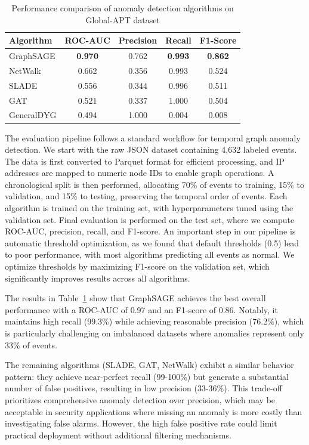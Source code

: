 \begin{table}[htbp]
\centering
\caption{Performance comparison of anomaly detection algorithms on Global-APT dataset}
\label{tab:results}
\small
\begin{tabular}{lcccc}
\toprule
\textbf{Algorithm} & \textbf{ROC-AUC} & \textbf{Precision} & \textbf{Recall} & \textbf{F1-Score} \\
\midrule
GraphSAGE & \textbf{0.970} & 0.762 & \textbf{0.993} & \textbf{0.862} \\
NetWalk & 0.662 & 0.356 & 0.993 & 0.524 \\
SLADE & 0.556 & 0.344 & 0.996 & 0.511 \\
GAT & 0.521 & 0.337 & 1.000 & 0.504 \\
GeneralDYG & 0.494 & 1.000 & 0.004 & 0.008 \\
\bottomrule
\end{tabular}
\end{table}

The evaluation pipeline follows a standard workflow for temporal graph anomaly detection. We start with the raw JSON dataset containing 4,632 labeled events. The data is first converted to Parquet format for efficient processing, and IP addresses are mapped to numeric node IDs to enable graph operations. A chronological split is then performed, allocating 70\% of events to training, 15\% to validation, and 15\% to testing, preserving the temporal order of events. Each algorithm is trained on the training set, with hyperparameters tuned using the validation set. Final evaluation is performed on the test set, where we compute ROC-AUC, precision, recall, and F1-score. An important step in our pipeline is automatic threshold optimization, as we found that default thresholds (0.5) lead to poor performance, with most algorithms predicting all events as normal. We optimize thresholds by maximizing F1-score on the validation set, which significantly improves results across all algorithms.

The results in Table~\ref{tab:results} show that GraphSAGE achieves the best overall performance with a ROC-AUC of 0.97 and an F1-score of 0.86. Notably, it maintains high recall (99.3\%) while achieving reasonable precision (76.2\%), which is particularly challenging on imbalanced datasets where anomalies represent only 33\% of events.

The remaining algorithms (SLADE, GAT, NetWalk) exhibit a similar behavior pattern: they achieve near-perfect recall (99-100\%) but generate a substantial number of false positives, resulting in low precision (33-36\%). This trade-off prioritizes comprehensive anomaly detection over precision, which may be acceptable in security applications where missing an anomaly is more costly than investigating false alarms. However, the high false positive rate could limit practical deployment without additional filtering mechanisms.


